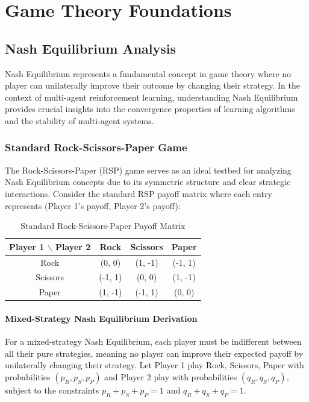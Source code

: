 \documentclass[conference]{IEEEtran}
\begin{document}
\section{Game Theory Foundations}

\subsection{Nash Equilibrium Analysis}

Nash Equilibrium represents a fundamental concept in game theory where no player can unilaterally improve their outcome by changing their strategy. In the context of multi-agent reinforcement learning, understanding Nash Equilibrium provides crucial insights into the convergence properties of learning algorithms and the stability of multi-agent systems.

\subsubsection{Standard Rock-Scissors-Paper Game}

The Rock-Scissors-Paper (RSP) game serves as an ideal testbed for analyzing Nash Equilibrium concepts due to its symmetric structure and clear strategic interactions. Consider the standard RSP payoff matrix where each entry represents (Player 1's payoff, Player 2's payoff):

\begin{table}[h!]
\centering
\caption{Standard Rock-Scissors-Paper Payoff Matrix}
\begin{tabular}{|c|c|c|c|}
\hline
Player 1 $\backslash$ Player 2 & Rock & Scissors & Paper \\
\hline
Rock & (0, 0) & (1, -1) & (-1, 1) \\
Scissors & (-1, 1) & (0, 0) & (1, -1) \\
Paper & (1, -1) & (-1, 1) & (0, 0) \\
\hline
\end{tabular}
\label{tab:standard_rsp}
\end{table}

\paragraph{Mixed-Strategy Nash Equilibrium Derivation}

For a mixed-strategy Nash Equilibrium, each player must be indifferent between all their pure strategies, meaning no player can improve their expected payoff by unilaterally changing their strategy. Let Player 1 play Rock, Scissors, Paper with probabilities $(p_R, p_S, p_P)$ and Player 2 play with probabilities $(q_R, q_S, q_P)$, subject to the constraints $p_R + p_S + p_P = 1$ and $q_R + q_S + q_P = 1$.
\end{document}
